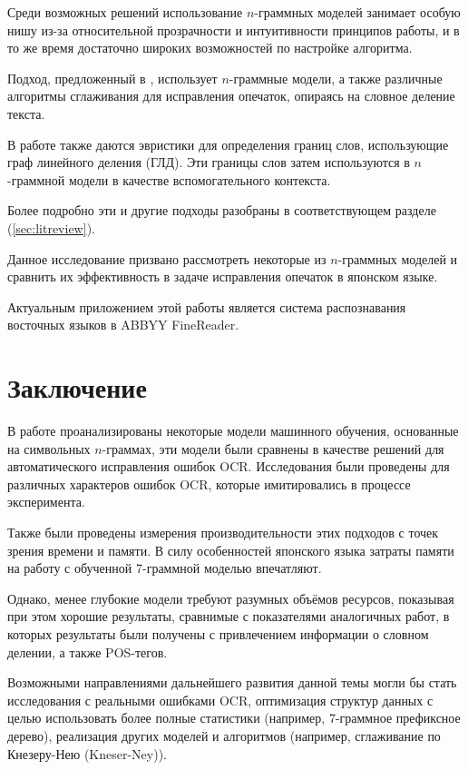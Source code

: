 \documentclass[14pt,russian]{extreport}
\theoremstyle{definition}
\begin{document}
Среди возможных решений использование $n$-граммных моделей занимает особую нишу из-за относительной прозрачности и интуитивности принципов работы, и в то же время достаточно широких возможностей по настройке алгоритма.

Подход, предложенный в \cite{nagata:shape}, использует $n$-граммные модели, а также различные алгоритмы сглаживания для исправления опечаток, опираясь на словное деление текста. 

В работе \cite{nagata:context} также даются эвристики для определения границ слов, использующие граф линейного деления (ГЛД). Эти границы слов затем используются в $n$-граммной модели в качестве вспомогательного контекста.

Более подробно эти и другие подходы разобраны в соответствующем разделе (\cref{sec:litreview}).

Данное исследование призвано рассмотреть некоторые из $n$-граммных моделей и сравнить их эффективность в задаче исправления опечаток в японском языке.

Актуальным приложением этой работы является система распознавания восточных языков в ABBYY FineReader.

\newpage


\newpage


\newpage


\newpage


\newpage


\newpage


\newpage


\newpage
\section{ Заключение }\label{sec:epilogue}

В работе проанализированы некоторые модели машинного обучения, основанные на символьных $n$-граммах, эти модели были сравнены в качестве решений для автоматического исправления ошибок OCR. Исследования были проведены для различных характеров ошибок OCR, которые имитировались в процессе эксперимента.

Также были проведены измерения производительности этих подходов с точек зрения времени и памяти. В силу особенностей японского языка затраты памяти на работу с обученной 7-граммной моделью впечатляют.

Однако, менее глубокие модели требуют разумных объёмов ресурсов, показывая при этом хорошие результаты, сравнимые с показателями аналогичных работ, в которых результаты были получены с привлечением информации о словном делении, а также POS-тегов.

Возможными направлениями дальнейшего развития данной темы могли бы стать исследования с реальными ошибками OCR, оптимизация структур данных с целью использовать более полные статистики (например, 7-граммное префиксное дерево), реализация других моделей и алгоритмов (например, сглаживание по Кнезеру-Нею (Kneser-Ney)).

\newpage


\newpage

\end{document}
